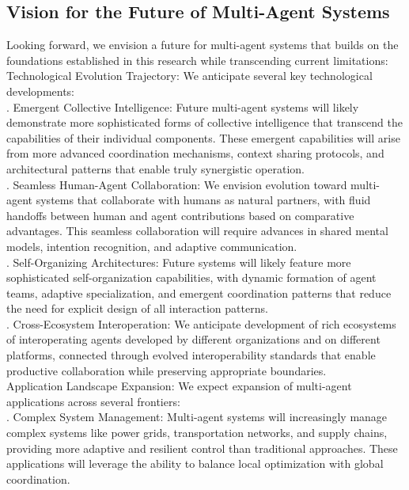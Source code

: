 \subsection{Vision for the Future of Multi-Agent Systems}
Looking forward, we envision a future for multi-agent systems that builds on the foundations established in this research while transcending current limitations:\\ \newline
Technological Evolution Trajectory: We anticipate several key technological developments:\\ . Emergent Collective Intelligence: Future multi-agent systems will likely demonstrate more sophisticated forms of collective intelligence that transcend the capabilities of their individual components. These emergent capabilities will arise from more advanced coordination mechanisms, context sharing protocols, and architectural patterns that enable truly synergistic operation.\\ . Seamless Human-Agent Collaboration: We envision evolution toward multi-agent systems that collaborate with humans as natural partners, with fluid handoffs between human and agent contributions based on comparative advantages. This seamless collaboration will require advances in shared mental models, intention recognition, and adaptive communication.\\ . Self-Organizing Architectures: Future systems will likely feature more sophisticated self-organization capabilities, with dynamic formation of agent teams, adaptive specialization, and emergent coordination patterns that reduce the need for explicit design of all interaction patterns.\\ . Cross-Ecosystem Interoperation: We anticipate development of rich ecosystems of interoperating agents developed by different organizations and on different platforms, connected through evolved interoperability standards that enable productive collaboration while preserving appropriate boundaries.\\ \newline
Application Landscape Expansion: We expect expansion of multi-agent applications across several frontiers:\\ . Complex System Management: Multi-agent systems will increasingly manage complex systems like power grids, transportation networks, and supply chains, providing more adaptive and resilient control than traditional approaches. These applications will leverage the ability to balance local optimization with global coordination.\\ \newline
